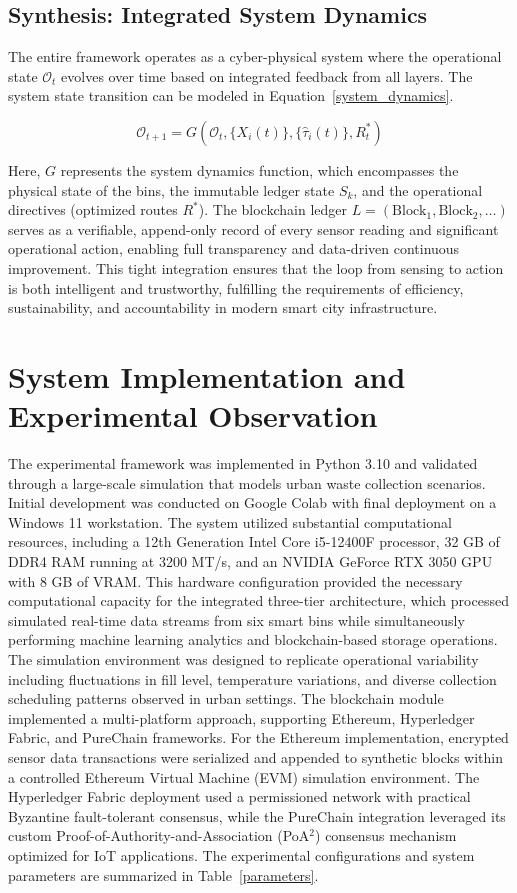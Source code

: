 \documentclass[final,5p,times,twocolumn]{elsarticle}
\begin{document}
\subsection{Synthesis: Integrated System Dynamics}
The entire framework operates as a cyber-physical system where the operational state \( \mathcal{O}_t \) evolves over time based on integrated feedback from all layers. The system state transition can be modeled in Equation~\ref{system_dynamics}.

\begin{equation}
\mathcal{O}_{t+1} = G(\mathcal{O}_t, \{X_i(t)\}, \{\hat{\tau}_i(t)\}, R^*_t)
\label{system_dynamics}
\end{equation}

\noindent Here, \( G \) represents the system dynamics function, which encompasses the physical state of the bins, the immutable ledger state \( S_k \), and the operational directives (optimized routes \( R^* \)). The blockchain ledger \( L = (\text{Block}_1, \text{Block}_2, \dots) \) serves as a verifiable, append-only record of every sensor reading and significant operational action, enabling full transparency and data-driven continuous improvement. This tight integration ensures that the loop from sensing to action is both intelligent and trustworthy, fulfilling the requirements of efficiency, sustainability, and accountability in modern smart city infrastructure.

\section{System Implementation and Experimental Observation}
The experimental framework was implemented in Python 3.10 and validated through a large-scale simulation that models urban waste collection scenarios. Initial development was conducted on Google Colab with final deployment on a Windows 11 workstation. The system utilized substantial computational resources, including a 12th Generation Intel Core i5-12400F processor, 32 GB of DDR4 RAM running at 3200 MT/s, and an NVIDIA GeForce RTX 3050 GPU with 8 GB of VRAM. This hardware configuration provided the necessary computational capacity for the integrated three-tier architecture, which processed simulated real-time data streams from six smart bins while simultaneously performing machine learning analytics and blockchain-based storage operations. The simulation environment was designed to replicate operational variability including fluctuations in fill level, temperature variations, and diverse collection scheduling patterns observed in urban settings. The blockchain module implemented a multi-platform approach, supporting Ethereum, Hyperledger Fabric, and PureChain frameworks. For the Ethereum implementation, encrypted sensor data transactions were serialized and appended to synthetic blocks within a controlled Ethereum Virtual Machine (EVM) simulation environment. The Hyperledger Fabric deployment used a permissioned network with practical Byzantine fault-tolerant consensus, while the PureChain integration leveraged its custom Proof-of-Authority-and-Association (PoA$^2$) consensus mechanism optimized for IoT applications. The experimental configurations and system parameters are summarized in Table~\ref{parameters}.
\end{document}
